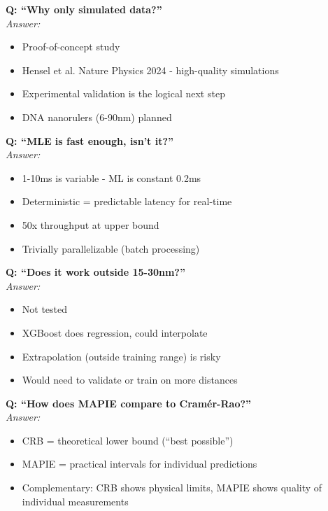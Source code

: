 \documentclass[a4paper,10pt]{article}
\begin{document}
\begin{mdframed}[style=warnung]
\textbf{Q: ``Why only simulated data?''}\\[5pt]
\textit{Answer:}
\begin{itemize}[leftmargin=*, nosep]
    \item Proof-of-concept study
    \item Hensel et al. Nature Physics 2024 - high-quality simulations
    \item Experimental validation is the logical next step
    \item DNA nanorulers (6-90nm) planned
\end{itemize}
\end{mdframed}

\begin{mdframed}[style=warnung]
\textbf{Q: ``MLE is fast enough, isn't it?''}\\[5pt]
\textit{Answer:}
\begin{itemize}[leftmargin=*, nosep]
    \item 1-10ms is variable - ML is constant 0.2ms
    \item Deterministic = predictable latency for real-time
    \item 50x throughput at upper bound
    \item Trivially parallelizable (batch processing)
\end{itemize}
\end{mdframed}

\begin{mdframed}[style=warnung]
\textbf{Q: ``Does it work outside 15-30nm?''}\\[5pt]
\textit{Answer:}
\begin{itemize}[leftmargin=*, nosep]
    \item Not tested
    \item XGBoost does regression, could interpolate
    \item Extrapolation (outside training range) is risky
    \item Would need to validate or train on more distances
\end{itemize}
\end{mdframed}

\begin{mdframed}[style=warnung]
\textbf{Q: ``How does MAPIE compare to Cram\'er-Rao?''}\\[5pt]
\textit{Answer:}
\begin{itemize}[leftmargin=*, nosep]
    \item CRB = theoretical lower bound (``best possible'')
    \item MAPIE = practical intervals for individual predictions
    \item Complementary: CRB shows physical limits, MAPIE shows quality of individual measurements
\end{itemize}
\end{mdframed}
\end{document}
